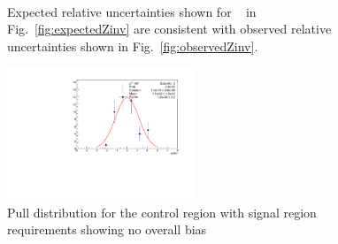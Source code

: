 \begin{figure}[h!]
  \centering
  ~~
  \\
  \caption{\label{fig:expectedObservedZinv}Expected relative uncertainties shown for \zInv~ in Fig.~\ref{fig:expectedZinv} are consistent
  with observed relative uncertainties shown in Fig.~\ref{fig:observedZinv}.}
\end{figure}

\begin{figure}[]
  \centering
  \includegraphics[width=0.5\textwidth]{figures/template/pullAtMu.pdf}
  \caption{\label{fig:pullAt} Pull distribution for
  the \mj control region with signal region \alt requirements showing no overall bias}
\end{figure}

